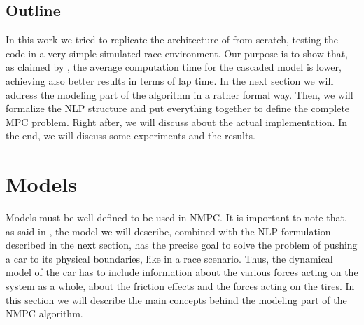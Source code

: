 \documentclass[a4paper, onecolumn, 11pt]{article}
\begin{document}
\subsection*{Outline}
In this work we tried to replicate the architecture of \cite{paper} from scratch,
testing the code in a very simple simulated race environment. Our purpose is to
show that, as claimed by \cite{paper}, the average computation time for the
cascaded model is lower, achieving also better results in terms of lap time.
In the next section we will address the modeling part of the algorithm in a
rather formal way. Then, we will formalize the NLP structure and put everything
together to define the complete MPC problem. Right after, we will discuss about
the actual implementation. In the end, we will discuss some experiments and the
results.


\section{Models}
Models must be well-defined to be used in NMPC. It is important to note that, as
said in \cite{paper}, the model we will describe, combined with the NLP
formulation described in the next section, has the precise goal to solve the
problem of pushing a car to its physical boundaries, like in a race scenario.
Thus, the dynamical model of the car has to include information about the
various forces acting on the system as a whole, about the friction effects and
the forces acting on the tires. In this section we will describe the main
concepts behind the modeling part of the NMPC algorithm. 
\end{document}
